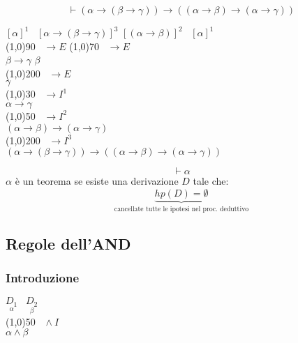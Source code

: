 \documentclass{article}
\theoremstyle{break}
\theoremstyle{break}
\theoremstyle{break}
\theoremstyle{break}
\begin{document}
\begin{exercise}[hard]
    \[
    \vdash (\alpha \to (\beta \to \gamma)) \to ((\alpha \to \beta) \to (\alpha \to \gamma))
    \] 
    \begin{center}
        \( [\alpha]^1\;\;\; [\alpha \to (\beta \to \gamma)]^3 \) \hspace{2.5cm} \([(\alpha \to \beta)]^2\;\;\; [\alpha]^1 \)\\
       \hspace{1cm}\line(1,0){90}\(\;\;\; \to E \) \hspace{1cm}\line(1,0){70}\(\;\;\; \to E \)\\
       \( \beta \to \gamma \) \hspace{3.5cm} \( \beta \)\\
        \hspace{1cm}\line(1,0){200}\( \;\;\; \to E \)\\
        \( \gamma \) \\
        \hspace{1cm}\line(1,0){30}\(\;\;\; \to I^1 \)\\
         \( \alpha \to  \gamma \) \\
         \hspace{1cm}\line(1,0){50}\(\;\;\; \to I^2 \)\\
         \( (\alpha \to \beta) \to (\alpha \to \gamma) \) \\
         \hspace{1cm}\line(1,0){200}\(\;\;\; \to I^3 \)\\
         \( (\alpha \to (\beta \to \gamma)) \to ((\alpha \to \beta) \to (\alpha \to \gamma)) \) 
    \end{center}
\end{exercise}

\begin{definition}
    \[
        \vdash \alpha
    \] 
    \( \alpha \) è un teorema se esiste una derivazione \( D \)
    tale che: \[ \underbrace{hp(D) = \emptyset}_{\text{cancellate tutte
    le ipotesi nel proc. deduttivo}} \] 
\end{definition}

\subsection{Regole dell'AND}
\subsubsection{Introduzione}
      \begin{center}
    \(
        \underset{\alpha}{D_1}\;\;\; \underset{\beta}{D_2}
    \)\\ 
        \hspace{0.6cm}\line(1,0){50}\(\;\;\; \wedge I \)\\  
    \(
        \alpha \wedge \beta
    \)
\end{center}
\end{document}
